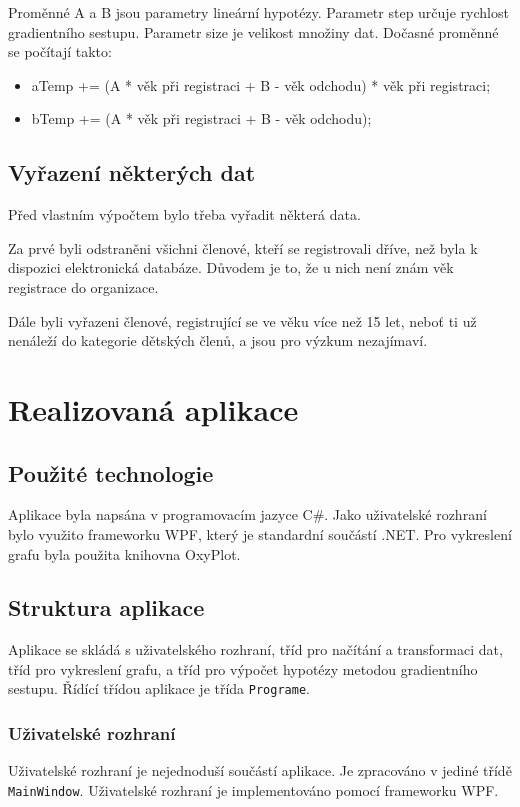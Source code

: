 \documentclass[a4paper,12pt]{article}
\begin{document}
Proměnné A a B jsou parametry lineární hypotézy. Parametr step určuje rychlost gradientního sestupu. Parametr size je velikost množiny dat. Dočasné proměnné se počítají takto:

\begin{itemize}
\item aTemp += (A * věk při registraci + B - věk odchodu) * věk při registraci;
\item bTemp += (A * věk při registraci + B - věk odchodu);
\end{itemize}



\subsection{Vyřazení některých dat}
Před vlastním výpočtem bylo třeba vyřadit některá data.

Za prvé byli odstraněni všichni členové, kteří se registrovali dříve, než byla k dispozici elektronická databáze. Důvodem je to, že u nich není znám věk registrace do organizace.

Dále byli vyřazeni členové, registrující se ve věku více než 15 let, neboť ti už nenáleží do kategorie dětských členů, a jsou pro výzkum nezajímaví.


\section{Realizovaná aplikace}

\subsection{Použité technologie}
Aplikace byla napsána v programovacím jazyce C\#. Jako uživatelské rozhraní bylo využito frameworku WPF, který je standardní součástí .NET. Pro vykreslení grafu byla použita knihovna OxyPlot\cite{oxyplot}.

\subsection{Struktura aplikace}
Aplikace se skládá s uživatelského rozhraní, tříd pro načítání a transformaci dat, tříd pro vykreslení grafu, a tříd pro výpočet hypotézy metodou gradientního sestupu. Řídící třídou aplikace je třída \texttt{Programe}.

\subsubsection{Uživatelské rozhraní}
Uživatelské rozhraní je nejednoduší součástí aplikace. Je zpracováno v jediné třídě \texttt{MainWindow}. Uživatelské rozhraní je implementováno pomocí frameworku WPF.
\end{document}
